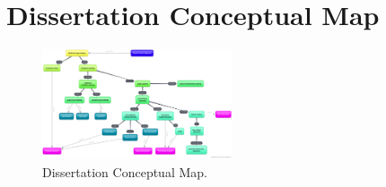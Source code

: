 \documentclass[
  twoside,
  11pt, a4paper,
  footinclude=true,
  headinclude=true,
  cleardoublepage=empty
]{scrbook}
\begin{document}
      \section{Dissertation Conceptual Map}
        \begin{figure}[h]
          \centering
          \includegraphics[angle=90,width=0.5\textwidth]{"./img/mind-map"}
          \caption[Dissertation Conceptual Map]{Dissertation Conceptual Map.}
          \label{appendix:concepts}
        \end{figure}



  \endgroup
\end{document}
